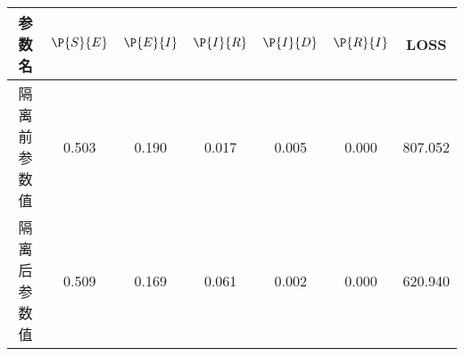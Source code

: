 \begin{tabular}{ccccccc}
\hline
参数名&$\P{S}{E}$&$\P{E}{I}$&$\P{I}{R}$&$\P{I}{D}$&$\P{R}{I}$&LOSS\\
\hline
隔离前参数值&0.503&0.190&0.017&0.005&0.000&807.052\\
隔离后参数值&0.509&0.169&0.061&0.002&0.000&620.940\\
\hline
\end{tabular}
